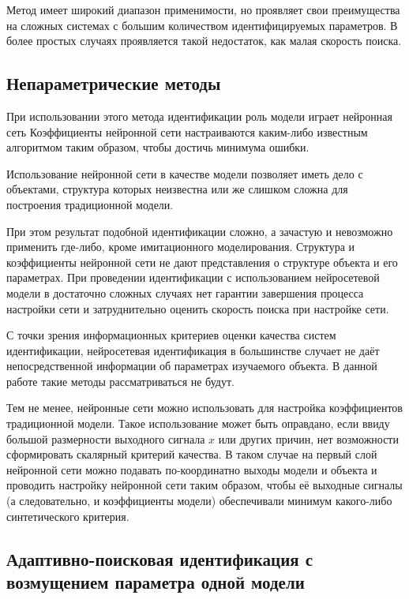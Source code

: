Метод имеет широкий диапазон применимости,
но проявляет свои преимущества на сложных 
системах с большим количеством идентифицируемых параметров.
В более простых случаях проявляется такой недостаток,
как малая скорость поиска.


\subsection{Непараметрические методы} %

При использовании этого метода идентификации
роль модели играет нейронная сеть
Коэффициенты нейронной сети настраиваются каким-либо
известным алгоритмом таким образом, чтобы
достичь минимума ошибки.

Использование нейронной сети в качестве модели позволяет иметь дело с
объектами, структура которых неизвестна или же слишком сложна для построения
традиционной модели.

При этом результат подобной идентификации сложно, а зачастую и невозможно
применить где-либо, кроме имитационного моделирования.  Структура и
коэффициенты нейронной сети не дают представления о структуре объекта и его
параметрах.  При проведении идентификации с использованием нейросетевой модели
в достаточно сложных случаях нет гарантии завершения процесса настройки сети и
затруднительно оценить скорость поиска при настройке сети.

С точки зрения информационных критериев оценки качества систем идентификации,
нейросетевая идентификация в большинстве случает не даёт непосредственной
информации об параметрах изучаемого объекта.  В данной работе такие методы
рассматриваться не будут.

Тем не менее, нейронные сети можно использовать для настройка коэффициентов
традиционной модели.  Такое использование может быть оправдано, если ввиду
большой размерности выходного сигнала \(x\) или других причин, нет возможности
сформировать скалярный критерий качества. В таком случае на первый слой
нейронной сети можно подавать по-координатно выходы модели и объекта и
проводить настройку нейронной сети таким образом, чтобы её выходные сигналы (а
следовательно, и коэффициенты модели) обеспечивали минимум какого-либо
синтетического критерия.


\subsection{Адаптивно-поисковая идентификация с возмущением параметра одной модели} %

